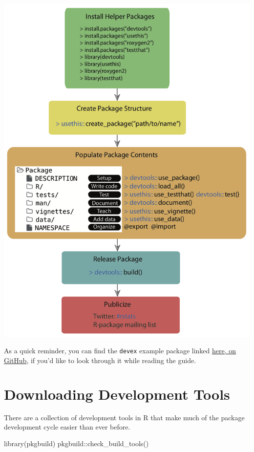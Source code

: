 \documentclass[
]{book}
\newenvironment{Shaded}{\begin{snugshade}}{\end{snugshade}}
\newcommand{\FunctionTok}[1]{\textcolor[rgb]{0.00,0.00,0.00}{#1}}
\newcommand{\NormalTok}[1]{#1}
\newcommand{\SpecialCharTok}[1]{\textcolor[rgb]{0.00,0.00,0.00}{#1}}
\begin{document}
\includegraphics{images/package_workflow2.png}

As a quick reminder, you can find the \texttt{devex} example package linked \href{https://github.com/IQSS/Rbuild/tree/master/devex}{here, on GitHub}, if you'd like to look through it while reading the guide.

\hypertarget{downloading-development-tools}{%
\section{Downloading Development Tools}\label{downloading-development-tools}}

There are a collection of development tools in R that make much of the package development cycle easier than ever before.

\begin{Shaded}
\begin{Highlighting}[]
\FunctionTok{library}\NormalTok{(pkgbuild)}
\NormalTok{pkgbuild}\SpecialCharTok{::}\FunctionTok{check\_build\_tools}\NormalTok{()}
\end{Highlighting}
\end{Shaded}
\end{document}
